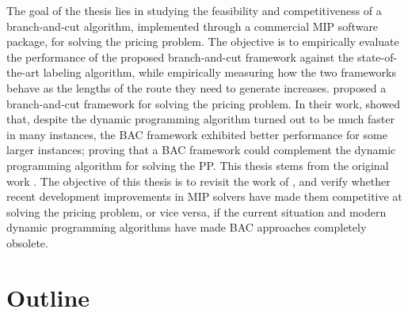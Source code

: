 The goal of the thesis lies in studying the feasibility and competitiveness of a
branch-and-cut algorithm, implemented through a commercial MIP software package,
for solving the pricing problem.
The objective is to empirically evaluate the performance of the proposed
branch-and-cut framework against the state-of-the-art labeling
algorithm, while empirically measuring how the two frameworks behave
as the lengths of the route they need to generate increases.
\cite{jepsen2014} proposed a branch-and-cut framework for solving the pricing problem.
In their work, \citeauthor{jepsen2014} showed that, despite the dynamic programming algorithm
turned out to be much faster in many instances, the BAC framework exhibited
better performance for some larger instances; proving that
a BAC framework could complement the dynamic programming algorithm for solving the PP.
This thesis stems from the original work \citeauthor{jepsen2014}.
The objective of this thesis is to revisit the work of \citeauthor{jepsen2014},
and verify whether recent development improvements in MIP solvers
have made them competitive at solving the pricing problem,
or vice versa,
if the current situation and modern dynamic programming algorithms have
made BAC approaches completely obsolete.


\section{Outline}
\label{sec:intro-outline}

